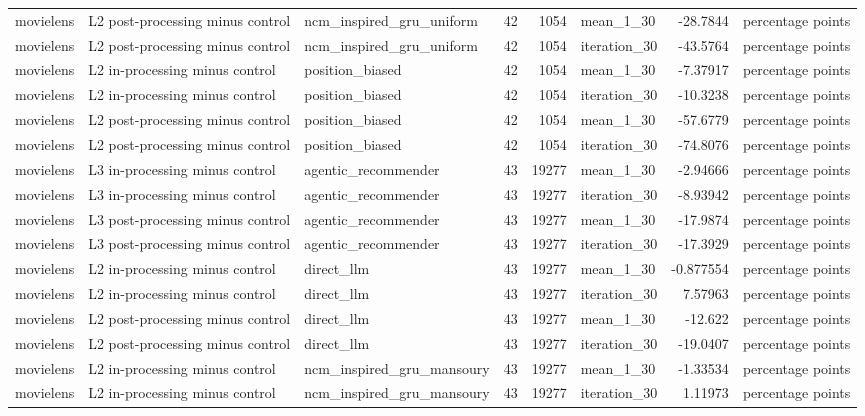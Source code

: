 \begin{table}[htbp!]
\begin{tabular}{lllrrlrl}
movielens & L2 post-processing minus control & ncm\_inspired\_gru\_uniform & 42 & 1054 & mean\_1\_30 & -28.7844 & percentage points \\
movielens & L2 post-processing minus control & ncm\_inspired\_gru\_uniform & 42 & 1054 & iteration\_30 & -43.5764 & percentage points \\
movielens & L2 in-processing minus control & position\_biased & 42 & 1054 & mean\_1\_30 & -7.37917 & percentage points \\
movielens & L2 in-processing minus control & position\_biased & 42 & 1054 & iteration\_30 & -10.3238 & percentage points \\
movielens & L2 post-processing minus control & position\_biased & 42 & 1054 & mean\_1\_30 & -57.6779 & percentage points \\
movielens & L2 post-processing minus control & position\_biased & 42 & 1054 & iteration\_30 & -74.8076 & percentage points \\
movielens & L3 in-processing minus control & agentic\_recommender & 43 & 19277 & mean\_1\_30 & -2.94666 & percentage points \\
movielens & L3 in-processing minus control & agentic\_recommender & 43 & 19277 & iteration\_30 & -8.93942 & percentage points \\
movielens & L3 post-processing minus control & agentic\_recommender & 43 & 19277 & mean\_1\_30 & -17.9874 & percentage points \\
movielens & L3 post-processing minus control & agentic\_recommender & 43 & 19277 & iteration\_30 & -17.3929 & percentage points \\
movielens & L2 in-processing minus control & direct\_llm & 43 & 19277 & mean\_1\_30 & -0.877554 & percentage points \\
movielens & L2 in-processing minus control & direct\_llm & 43 & 19277 & iteration\_30 & 7.57963 & percentage points \\
movielens & L2 post-processing minus control & direct\_llm & 43 & 19277 & mean\_1\_30 & -12.622 & percentage points \\
movielens & L2 post-processing minus control & direct\_llm & 43 & 19277 & iteration\_30 & -19.0407 & percentage points \\
movielens & L2 in-processing minus control & ncm\_inspired\_gru\_mansoury & 43 & 19277 & mean\_1\_30 & -1.33534 & percentage points \\
movielens & L2 in-processing minus control & ncm\_inspired\_gru\_mansoury & 43 & 19277 & iteration\_30 & 1.11973 & percentage points \\

\end{tabular}
\end{table}
